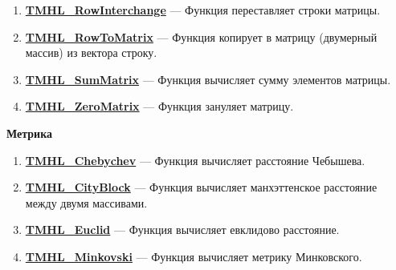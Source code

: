 \documentclass[a4paper,12pt]{article}
\begin{document}
\begin{enumerate}
\item \textbf{\hyperref[TMHL_RowInterchange]{TMHL\_RowInterchange}} --- Функция переставляет строки матрицы.

\item \textbf{\hyperref[TMHL_RowToMatrix]{TMHL\_RowToMatrix}} --- Функция копирует в матрицу (двумерный массив) из вектора строку.

\item \textbf{\hyperref[TMHL_SumMatrix]{TMHL\_SumMatrix}} --- Функция вычисляет сумму элементов матрицы.

\item \textbf{\hyperref[TMHL_ZeroMatrix]{TMHL\_ZeroMatrix}} --- Функция зануляет матрицу.

\end{enumerate}

\textbf{Метрика}
\begin{enumerate}

\item \textbf{\hyperref[TMHL_Chebychev]{TMHL\_Chebychev}} --- Функция вычисляет расстояние Чебышева.

\item \textbf{\hyperref[TMHL_CityBlock]{TMHL\_CityBlock}} --- Функция вычисляет манхэттенское расстояние между двумя массивами.

\item \textbf{\hyperref[TMHL_Euclid]{TMHL\_Euclid}} --- Функция вычисляет евклидово расстояние.

\item \textbf{\hyperref[TMHL_Minkovski]{TMHL\_Minkovski}} --- Функция вычисляет метрику Минковского.

\end{enumerate}
\end{document}
